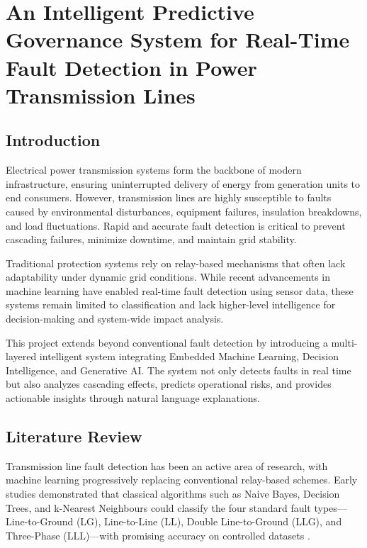 \chapter{An Intelligent Predictive Governance System for Real-Time Fault Detection in Power Transmission Lines}

\section{\textbf{Introduction}}

Electrical power transmission systems form the backbone of modern infrastructure, ensuring uninterrupted delivery of energy from generation units to end consumers. However, transmission lines are highly susceptible to faults caused by environmental disturbances, equipment failures, insulation breakdowns, and load fluctuations. Rapid and accurate fault detection is critical to prevent cascading failures, minimize downtime, and maintain grid stability.

Traditional protection systems rely on relay-based mechanisms that often lack adaptability under dynamic grid conditions. While recent advancements in machine learning have enabled real-time fault detection using sensor data, these systems remain limited to classification and lack higher-level intelligence for decision-making and system-wide impact analysis.

This project extends beyond conventional fault detection by introducing a multi-layered intelligent system integrating Embedded Machine Learning, Decision Intelligence, and Generative AI. The system not only detects faults in real time but also analyzes cascading effects, predicts operational risks, and provides actionable insights through natural language explanations.

\section{\textbf{Literature Review}}

Transmission line fault detection has been an active area of research, with machine learning progressively replacing conventional relay-based schemes. Early studies demonstrated that classical algorithms such as Naive Bayes, Decision Trees, and k-Nearest Neighbours could classify the four standard fault types—Line-to-Ground (LG), Line-to-Line (LL), Double Line-to-Ground (LLG), and Three-Phase (LLL)—with promising accuracy on controlled datasets \cite{Zhang2025}.

